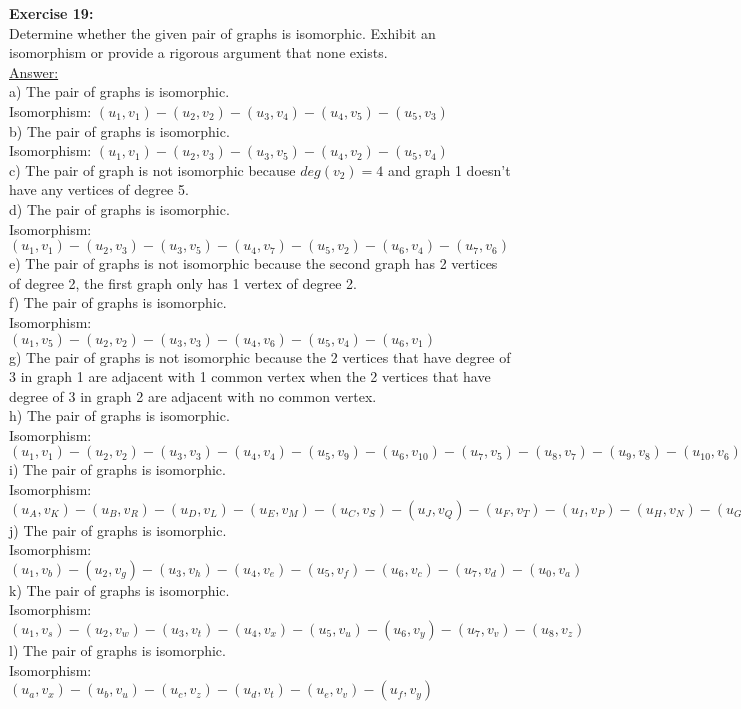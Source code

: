 \documentclass[10pt]{article}
\begin{document}
	\textbf{Exercise 19:}\\
Determine whether the given pair of graphs is isomorphic. Exhibit an isomorphism or provide a rigorous argument that none exists.\\
\underline{Answer:}\\
a) The pair of graphs is isomorphic. \\
Isomorphism: $(u_{1},v_{1})-(u_{2},v_{2})-(u_{3},v_{4})-(u_{4},v_{5})-(u_{5},v_{3})$\\
b) The pair of graphs is isomorphic.\\
Isomorphism: $(u_{1},v_{1})-(u_{2},v_{3})-(u_{3},v_{5})-(u_{4},v_{2})-(u_{5},v_{4})$\\
c) The pair of  graph is not isomorphic because $deg(v_{2}) = 4$ and graph 1 doesn't have any vertices of degree 5.\\
d) The pair of graphs is isomorphic.\\
Isomorphism: $(u_{1},v_{1})-(u_{2},v_{3})-(u_{3},v_{5})-(u_{4},v_{7})-(u_{5},v_{2})-(u_{6},v_{4})-(u_{7},v_{6})$\\
e) The pair of graphs is not isomorphic because the second graph has 2 vertices of degree 2, the first graph only has 1 vertex of degree 2.\\
f)  The pair of graphs is isomorphic.\\
Isomorphism: $(u_{1},v_{5})-(u_{2},v_{2})-(u_{3},v_{3})-(u_{4},v_{6})-(u_{5},v_{4})-(u_{6},v_{1})$\\
g) The pair of graphs is not isomorphic because the 2 vertices that have degree of 3 in graph 1 are adjacent with 1 common vertex when the 2 vertices that have degree of 3 in graph 2 are adjacent with no common vertex.\\
h) The pair of graphs is isomorphic.\\
Isomorphism: $(u_{1},v_{1})-(u_{2},v_{2})-(u_{3},v_{3})-(u_{4},v_{4})-(u_{5},v_{9})-(u_{6},v_{10})-(u_{7},v_{5})-(u_{8},v_{7})-(u_{9},v_{8})-(u_{10},v_{6})$\\
i) The pair of graphs is isomorphic.\\
Isomorphism: $(u_{A},v_{K})-(u_{B},v_{R})-(u_{D},v_{L})-(u_{E},v_{M})-(u_{C},v_{S})-(u_{J},v_{Q})-(u_{F},v_{T})-(u_{I},v_{P})-(u_{H},v_{N})-(u_{G},v_{O})$\\
j) The pair of graphs is isomorphic.\\
Isomorphism: $(u_{1},v_{b})-(u_{2},v_{g})-(u_{3},v_{h})-(u_{4},v_{e})-(u_{5},v_{f})-(u_{6},v_{c})-(u_{7},v_{d})-(u_{0},v_{a})$\\
k) The pair of graphs is isomorphic.\\
Isomorphism: $(u_{1},v_{s})-(u_{2},v_{w})-(u_{3},v_{t})-(u_{4},v_{x})-(u_{5},v_{u})-(u_{6},v_{y})-(u_{7},v_{v})-(u_{8},v_{z})$\\
l) The pair of graphs is isomorphic.\\
Isomorphism: $(u_{a},v_{x})-(u_{b},v_{u})-(u_{c},v_{z})-(u_{d},v_{t})-(u_{e},v_{v})-(u_{f},v_{y})$\\
\end{document}
